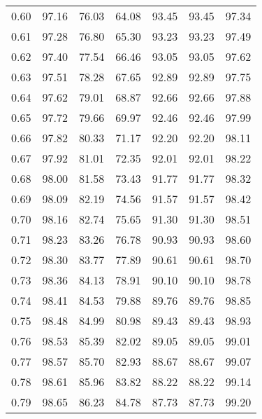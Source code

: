 \begin{tabular}{|c|c|c|c|c|c|c|}
      0.60 &     97.16 &     76.03 &      64.08 &   93.45 &      93.45 &         97.34 \\
      0.61 &     97.28 &     76.80 &      65.30 &   93.23 &      93.23 &         97.49 \\
      0.62 &     97.40 &     77.54 &      66.46 &   93.05 &      93.05 &         97.62 \\
      0.63 &     97.51 &     78.28 &      67.65 &   92.89 &      92.89 &         97.75 \\
      0.64 &     97.62 &     79.01 &      68.87 &   92.66 &      92.66 &         97.88 \\
      0.65 &     97.72 &     79.66 &      69.97 &   92.46 &      92.46 &         97.99 \\
      0.66 &     97.82 &     80.33 &      71.17 &   92.20 &      92.20 &         98.11 \\
      0.67 &     97.92 &     81.01 &      72.35 &   92.01 &      92.01 &         98.22 \\
      0.68 &     98.00 &     81.58 &      73.43 &   91.77 &      91.77 &         98.32 \\
      0.69 &     98.09 &     82.19 &      74.56 &   91.57 &      91.57 &         98.42 \\
      0.70 &     98.16 &     82.74 &      75.65 &   91.30 &      91.30 &         98.51 \\
      0.71 &     98.23 &     83.26 &      76.78 &   90.93 &      90.93 &         98.60 \\
      0.72 &     98.30 &     83.77 &      77.89 &   90.61 &      90.61 &         98.70 \\
      0.73 &     98.36 &     84.13 &      78.91 &   90.10 &      90.10 &         98.78 \\
      0.74 &     98.41 &     84.53 &      79.88 &   89.76 &      89.76 &         98.85 \\
      0.75 &     98.48 &     84.99 &      80.98 &   89.43 &      89.43 &         98.93 \\
      0.76 &     98.53 &     85.39 &      82.02 &   89.05 &      89.05 &         99.01 \\
      0.77 &     98.57 &     85.70 &      82.93 &   88.67 &      88.67 &         99.07 \\
      0.78 &     98.61 &     85.96 &      83.82 &   88.22 &      88.22 &         99.14 \\
      0.79 &     98.65 &     86.23 &      84.78 &   87.73 &      87.73 &         99.20 \\

\end{tabular}
